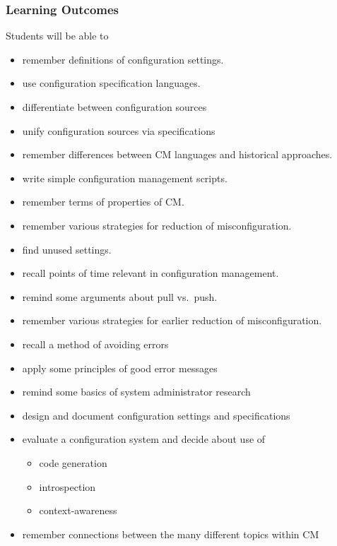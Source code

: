\begin{frame}
	\tiny
	\frametitle{Learning Outcomes}
	Students will be able to

	\begin{itemize}
	\item remember definitions of configuration settings.

	\item use configuration specification languages.

	\item differentiate between configuration sources
	\item unify configuration sources via specifications

	\item remember differences between CM languages and historical approaches.
	\item write simple configuration management scripts.

	\item remember terms of properties of CM.
	\item remember various strategies for reduction of misconfiguration.
	\item find unused settings.

	\item recall points of time relevant in configuration management.
	\item remind some arguments about pull vs.\ push.
	\item remember various strategies for earlier reduction of misconfiguration.

	\item recall a method of avoiding errors
	\item apply some principles of good error messages
	\item remind some basics of system administrator research

	\item design and document configuration settings and specifications
	\item evaluate a configuration system and decide about use of
	\begin{itemize}
	\tiny
	\item code generation
	\item introspection
	\item context-awareness
	\end{itemize}
	\item remember connections between the many different topics within CM
	\end{itemize}
\end{frame}

